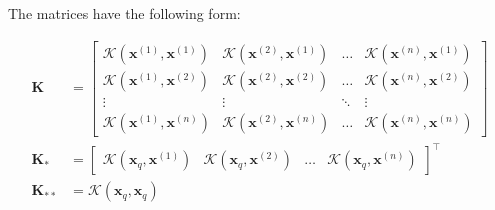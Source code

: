 \begin{frame}
	The matrices have the following form:

	\begin{align}
		\bm{K} &=
		\begin{bmatrix}
			\mathcal{K}(\bm{x}^{(1)}, \bm{x}^{(1)}) 	& \mathcal{K}(\bm{x}^{(2)}, \bm{x}^{(1)}) & \hdots & \mathcal{K}(\bm{x}^{(n)}, \bm{x}^{(1)}) 	\\
			\mathcal{K}(\bm{x}^{(1)}, \bm{x}^{(2)}) 	& \mathcal{K}(\bm{x}^{(2)}, \bm{x}^{(2)}) & \hdots & \mathcal{K}(\bm{x}^{(n)}, \bm{x}^{(2)}) 	\\
			\vdots 							& \vdots 							& \ddots & \vdots 							\\
			\mathcal{K}(\bm{x}^{(1)}, \bm{x}^{(n)}) 	& \mathcal{K}(\bm{x}^{(2)}, \bm{x}^{(n)}) & \hdots & \mathcal{K}(\bm{x}^{(n)}, \bm{x}^{(n)})
		\end{bmatrix} \\[8mm]
		\bm{K}_* &=
		\begin{bmatrix}
			\mathcal{K}(\bm{x}_q, \bm{x}^{(1)}) & \mathcal{K}(\bm{x}_q, \bm{x}^{(2)}) & \dots & \mathcal{K}(\bm{x}_q, \bm{x}^{(n)})
		\end{bmatrix}^{\intercal} \\[8mm]
		\bm{K}_{**} &= \mathcal{K}(\bm{x}_q, \bm{x}_q)
	\end{align}

\end{frame}


